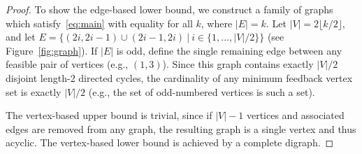 \documentclass[preprint,12pt]{elsarticle}
\begin{document}
\begin{proof}
To show the edge-based lower bound, we construct a family of graphs which satisfy~\eqref{eq:main} with equality for all $k$, where $|E|=k$.
Let $|V|=2\lfloor k/2\rfloor$, and let $E=\{(2i,2i-1)\cup(2i-1,2i)\ |\ i\in\{1,\ldots,|V|/2\}\}$ (see Figure~\ref{fig:graph}).
If $|E|$ is odd, define the single remaining edge between any feasible pair of vertices (e.g., $(1,3)$).
Since this graph contains exactly $|V|/2$ disjoint length-2 directed cycles, the cardinality of any minimum feedback vertex set is exactly $|V|/2$ (e.g., the set of odd-numbered vertices is such a set).
%


The vertex-based upper bound is trivial, since if $|V|-1$ vertices and associated edges are removed from any graph, the resulting graph is a single vertex and thus acyclic.
The vertex-based lower bound is achieved by a complete digraph.
\end{proof}





 

\end{document}
